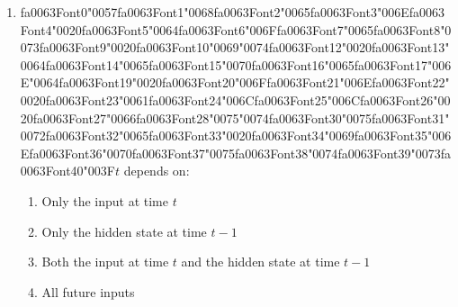 \documentclass[12pt]{article}
\begin{document}
\begin{enumerate}[label=Q\arabic*.]
\item {\csname fa0063Font0\endcsname\char"0057}{\csname fa0063Font1\endcsname\char"0068}{\csname fa0063Font2\endcsname\char"0065}{\csname fa0063Font3\endcsname\char"006E}{\csname fa0063Font4\endcsname\char"0020}{\csname fa0063Font5\endcsname\char"0064}{\csname fa0063Font6\endcsname\char"006F}{\csname fa0063Font7\endcsname\char"0065}{\csname fa0063Font8\endcsname\char"0073}{\csname fa0063Font9\endcsname\char"0020}{\csname fa0063Font10\endcsname\char"0069}{\char"0074}{\csname fa0063Font12\endcsname\char"0020}{\csname fa0063Font13\endcsname\char"0064}{\csname fa0063Font14\endcsname\char"0065}{\csname fa0063Font15\endcsname\char"0070}{\csname fa0063Font16\endcsname\char"0065}{\csname fa0063Font17\endcsname\char"006E}{\char"0064}{\csname fa0063Font19\endcsname\char"0020}{\csname fa0063Font20\endcsname\char"006F}{\csname fa0063Font21\endcsname\char"006E}{\csname fa0063Font22\endcsname\char"0020}{\csname fa0063Font23\endcsname\char"0061}{\csname fa0063Font24\endcsname\char"006C}{\csname fa0063Font25\endcsname\char"006C}{\csname fa0063Font26\endcsname\char"0020}{\csname fa0063Font27\endcsname\char"0066}{\csname fa0063Font28\endcsname\char"0075}{\char"0074}{\csname fa0063Font30\endcsname\char"0075}{\csname fa0063Font31\endcsname\char"0072}{\csname fa0063Font32\endcsname\char"0065}{\csname fa0063Font33\endcsname\char"0020}{\csname fa0063Font34\endcsname\char"0069}{\csname fa0063Font35\endcsname\char"006E}{\csname fa0063Font36\endcsname\char"0070}{\csname fa0063Font37\endcsname\char"0075}{\csname fa0063Font38\endcsname\char"0074}{\csname fa0063Font39\endcsname\char"0073}{\csname fa0063Font40\endcsname\char"003F}$t$ depends on:
\begin{enumerate}[label=(\Alph*)]
    \item Only the input at time $t$
    \item Only the hidden state at time $t-1$
    \item Both the input at time $t$ and the hidden state at time $t-1$
    \item All future inputs
\end{enumerate}

\end{enumerate}
\end{document}
